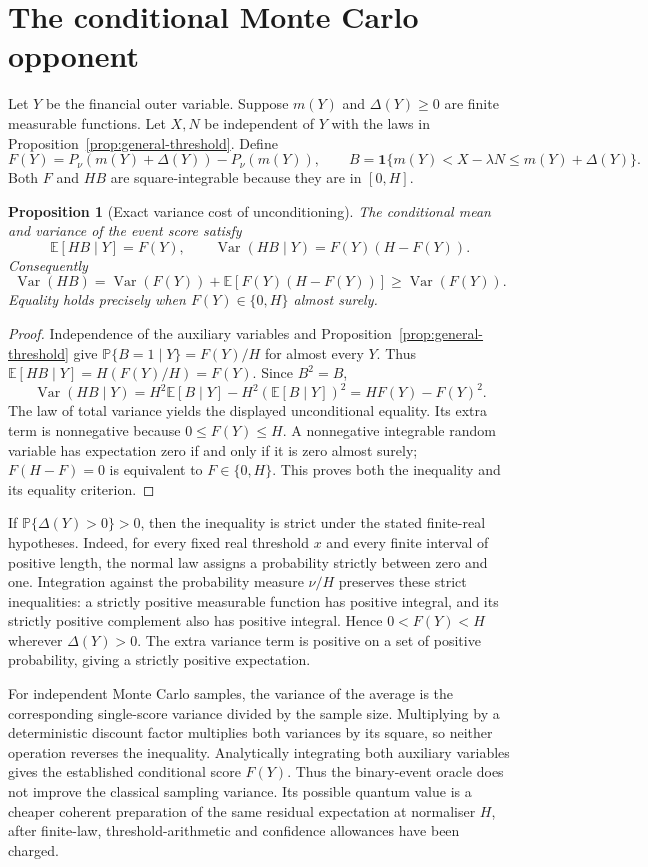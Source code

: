 \documentclass[11pt,a4paper]{article}
\newtheorem{proposition}{Proposition}[section]
\newcommand{\E}{\mathbb E}
\newcommand{\Prb}{\mathbb P}
\newcommand{\ind}{\mathbf 1}
\begin{document}
\section{The conditional Monte Carlo opponent}
Let $Y$ be the financial outer variable. Suppose $m(Y)$ and
$\Delta(Y)\ge0$ are finite measurable functions. Let $X,N$ be independent
of $Y$ with the laws in Proposition~\ref{prop:general-threshold}. Define
\[
 F(Y)=P_\nu(m(Y)+\Delta(Y))-P_\nu(m(Y)),\qquad
 B=\ind\{m(Y)<X-\lambda N\le m(Y)+\Delta(Y)\}.
\]
Both $F$ and $HB$ are square-integrable because they are in $[0,H]$.

\begin{proposition}[Exact variance cost of unconditioning]
\label{prop:variance}
The conditional mean and variance of the event score satisfy
\[
 \E[HB\mid Y]=F(Y),\qquad
 \operatorname{Var}(HB\mid Y)=F(Y)(H-F(Y)).
\]
Consequently
\[
 \operatorname{Var}(HB)
 =\operatorname{Var}(F(Y))
  +\E[F(Y)(H-F(Y))]
 \ge\operatorname{Var}(F(Y)).
\]
Equality holds precisely when $F(Y)\in\{0,H\}$ almost surely.
\end{proposition}
\begin{proof}
Independence of the auxiliary variables and Proposition~\ref{prop:general-threshold}
give $\Prb\{B=1\mid Y\}=F(Y)/H$ for almost every $Y$. Thus
$\E[HB\mid Y]=H(F(Y)/H)=F(Y)$. Since $B^2=B$,
\[
 \operatorname{Var}(HB\mid Y)
 =H^2\E[B\mid Y]-H^2(\E[B\mid Y])^2
 =HF(Y)-F(Y)^2.
\]
The law of total variance yields the displayed unconditional equality.
Its extra term is nonnegative because $0\le F(Y)\le H$. A nonnegative
integrable random variable has expectation zero if and only if it is zero
almost surely; $F(H-F)=0$ is equivalent to $F\in\{0,H\}$. This proves
both the inequality and its equality criterion.
\end{proof}

If $\Prb\{\Delta(Y)>0\}>0$, then the inequality is strict under the
stated finite-real hypotheses. Indeed, for every fixed real threshold $x$
and every finite interval of positive length, the normal law assigns a
probability strictly between zero and one. Integration against the
probability measure $\nu/H$ preserves these strict inequalities: a
strictly positive measurable function has positive integral, and its
strictly positive complement also has positive integral. Hence
$0<F(Y)<H$ wherever $\Delta(Y)>0$. The extra variance term is positive
on a set of positive probability, giving a strictly positive expectation.

For independent Monte Carlo samples, the variance of the average is the
corresponding single-score variance divided by the sample size. Multiplying
by a deterministic discount factor multiplies both variances by its square,
so neither operation reverses the inequality. Analytically integrating
both auxiliary variables gives the established conditional score $F(Y)$.
Thus the binary-event oracle does not improve the classical sampling
variance. Its possible quantum value is a cheaper coherent preparation of
the same residual expectation at normaliser $H$, after finite-law,
threshold-arithmetic and confidence allowances have been charged.
\end{document}
